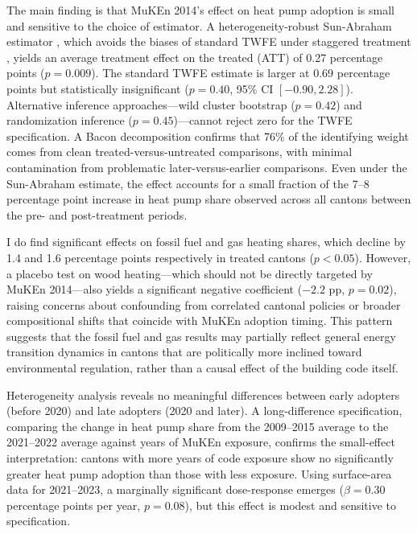 \documentclass[12pt]{article}
\begin{document}
The main finding is that MuKEn 2014's effect on heat pump adoption is small and sensitive to the choice of estimator. A heterogeneity-robust Sun-Abraham estimator \citep{sun2021estimating}, which avoids the biases of standard TWFE under staggered treatment \citep{goodman2021difference}, yields an average treatment effect on the treated (ATT) of 0.27 percentage points ($p = 0.009$). The standard TWFE estimate is larger at 0.69 percentage points but statistically insignificant ($p = 0.40$, 95\% CI $[-0.90, 2.28]$). Alternative inference approaches---wild cluster bootstrap ($p = 0.42$) and randomization inference ($p = 0.45$)---cannot reject zero for the TWFE specification. A Bacon decomposition confirms that 76\% of the identifying weight comes from clean treated-versus-untreated comparisons, with minimal contamination from problematic later-versus-earlier comparisons. Even under the Sun-Abraham estimate, the effect accounts for a small fraction of the 7--8 percentage point increase in heat pump share observed across all cantons between the pre- and post-treatment periods.

I do find significant effects on fossil fuel and gas heating shares, which decline by 1.4 and 1.6 percentage points respectively in treated cantons ($p < 0.05$). However, a placebo test on wood heating---which should not be directly targeted by MuKEn 2014---also yields a significant negative coefficient ($-2.2$ pp, $p = 0.02$), raising concerns about confounding from correlated cantonal policies or broader compositional shifts that coincide with MuKEn adoption timing. This pattern suggests that the fossil fuel and gas results may partially reflect general energy transition dynamics in cantons that are politically more inclined toward environmental regulation, rather than a causal effect of the building code itself.

Heterogeneity analysis reveals no meaningful differences between early adopters (before 2020) and late adopters (2020 and later). A long-difference specification, comparing the change in heat pump share from the 2009--2015 average to the 2021--2022 average against years of MuKEn exposure, confirms the small-effect interpretation: cantons with more years of code exposure show no significantly greater heat pump adoption than those with less exposure. Using surface-area data for 2021--2023, a marginally significant dose-response emerges ($\beta = 0.30$ percentage points per year, $p = 0.08$), but this effect is modest and sensitive to specification.
\end{document}
